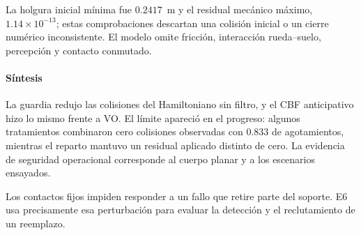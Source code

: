 La holgura inicial mínima fue \(0.2417\)~m y el residual mecánico máximo, \(1.14\times10^{-13}\); estas comprobaciones descartan una colisión inicial o un cierre numérico inconsistente. El modelo omite fricción, interacción rueda--suelo, percepción y contacto conmutado.

\paragraph{Síntesis}

La guardia redujo las colisiones del Hamiltoniano sin filtro, y el CBF anticipativo hizo lo mismo frente a VO. El límite apareció en el progreso: algunos tratamientos combinaron cero colisiones observadas con $0.833$ de agotamientos, mientras el reparto mantuvo un residual aplicado distinto de cero. La evidencia de seguridad operacional corresponde al cuerpo planar y a los escenarios ensayados.

Los contactos fijos impiden responder a un fallo que retire parte del soporte. E6 usa precisamente esa perturbación para evaluar la detección y el reclutamiento de un reemplazo.

